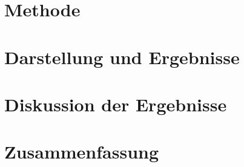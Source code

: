 \section{Methode} %



\newpage


\section{Darstellung und Ergebnisse} %



\newpage


\section{Diskussion der Ergebnisse} %



\newpage


\section{Zusammenfassung} %



\newpage

\begin{thebibliography}{9} %








 
\end{thebibliography}


